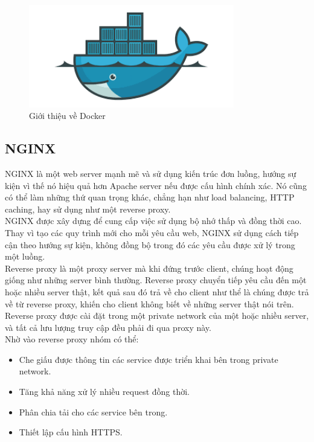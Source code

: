 			 \begin{figure}[H]
            	\includegraphics[width=0.8\textwidth]{Images/docker.png}
            	\centering
            	\linebreak
            	\caption{Giới thiệu về Docker}
            \end{figure}
            
            
            \subsection{NGINX}
            
            NGINX\cite{nginx} là một web server mạnh mẽ và sử dụng kiến trúc đơn luồng, hướng sự kiện vì thế nó hiệu quả hơn Apache server nếu được cấu hình chính xác. Nó cũng có thể làm những thứ quan trọng khác, chẳng hạn như load balancing, HTTP caching, hay sử dụng như một reverse proxy.\\
            
            NGINX được xây dựng để cung cấp việc sử dụng bộ nhớ thấp và đồng thời cao. Thay vì tạo các quy trình mới cho mỗi yêu cầu web, NGINX sử dụng cách tiếp cận theo hướng sự kiện, không đồng bộ trong đó các yêu cầu được xử lý trong một luồng.\\
            
            Reverse proxy là một proxy server mà khi đứng trước client, chúng hoạt động giống như những server bình thường. Reverse proxy chuyển tiếp yêu cầu đến một hoặc nhiều server thật, kết quả sau đó trả về cho client như thể là chúng được trả về từ reverse proxy, khiến cho client không biết về những server thật nói trên. Reverse proxy được cài đặt trong một private network của một hoặc nhiều server, và tất cả lưu lượng truy cập đều phải đi qua proxy này.\\
            
            Nhờ vào reverse proxy nhóm có thể:
            
            \begin{itemize}
                \item Che giấu được thông tin các service được triển khai bên trong private network.
                \item Tăng khả năng xử lý nhiều request đồng thời.
                \item Phân chia tải cho các service bên trong.
                \item Thiết lập cấu hình HTTPS.
            \end{itemize}
        
